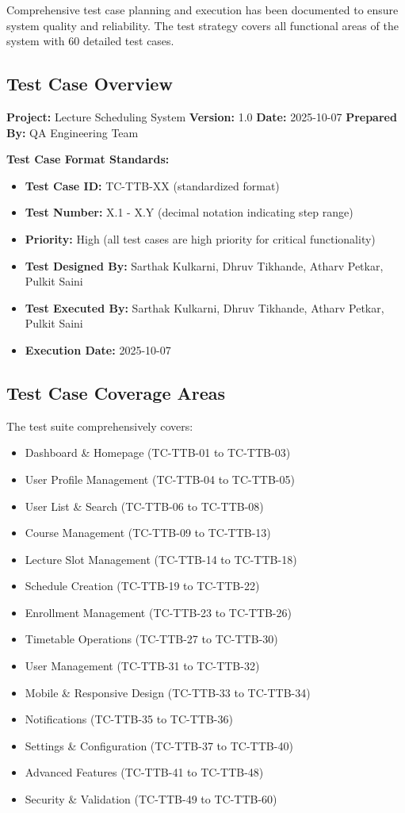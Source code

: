 Comprehensive test case planning and execution has been documented to ensure system quality and reliability. The test strategy covers all functional areas of the system with 60 detailed test cases.

\subsection{Test Case Overview}

\textbf{Project:} Lecture Scheduling System  
\textbf{Version:} 1.0  
\textbf{Date:} 2025-10-07  
\textbf{Prepared By:} QA Engineering Team

\textbf{Test Case Format Standards:}
\begin{itemize}[leftmargin=*]
    \item \textbf{Test Case ID:} TC-TTB-XX (standardized format)
    \item \textbf{Test Number:} X.1 - X.Y (decimal notation indicating step range)
    \item \textbf{Priority:} High (all test cases are high priority for critical functionality)
    \item \textbf{Test Designed By:} Sarthak Kulkarni, Dhruv Tikhande, Atharv Petkar, Pulkit Saini
    \item \textbf{Test Executed By:} Sarthak Kulkarni, Dhruv Tikhande, Atharv Petkar, Pulkit Saini
    \item \textbf{Execution Date:} 2025-10-07
\end{itemize}

\subsection{Test Case Coverage Areas}

The test suite comprehensively covers:
\begin{itemize}[leftmargin=*]
    \item Dashboard \& Homepage (TC-TTB-01 to TC-TTB-03)
    \item User Profile Management (TC-TTB-04 to TC-TTB-05)
    \item User List \& Search (TC-TTB-06 to TC-TTB-08)
    \item Course Management (TC-TTB-09 to TC-TTB-13)
    \item Lecture Slot Management (TC-TTB-14 to TC-TTB-18)
    \item Schedule Creation (TC-TTB-19 to TC-TTB-22)
    \item Enrollment Management (TC-TTB-23 to TC-TTB-26)
    \item Timetable Operations (TC-TTB-27 to TC-TTB-30)
    \item User Management (TC-TTB-31 to TC-TTB-32)
    \item Mobile \& Responsive Design (TC-TTB-33 to TC-TTB-34)
    \item Notifications (TC-TTB-35 to TC-TTB-36)
    \item Settings \& Configuration (TC-TTB-37 to TC-TTB-40)
    \item Advanced Features (TC-TTB-41 to TC-TTB-48)
    \item Security \& Validation (TC-TTB-49 to TC-TTB-60)
\end{itemize}

